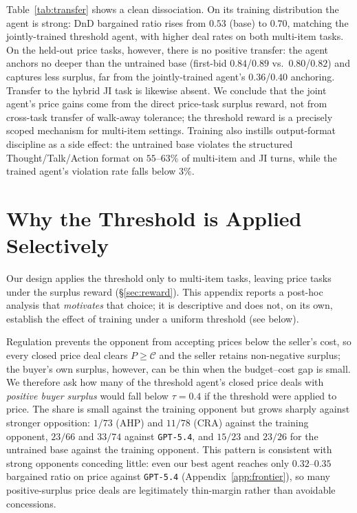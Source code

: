 \documentclass[11pt]{article}
\newcommand{\model}[1]{\texttt{#1}}
\begin{document}
Table~\ref{tab:transfer} shows a clean dissociation. On its training distribution the agent is strong: DnD bargained ratio rises from $0.53$ (base) to $0.70$, matching the jointly-trained threshold agent, with higher deal rates on both multi-item tasks. On the held-out price tasks, however, there is no positive transfer: the agent anchors no deeper than the untrained base (first-bid $0.84$/$0.89$ vs.\ $0.80$/$0.82$) and captures less surplus, far from the jointly-trained agent's $0.36$/$0.40$ anchoring. Transfer to the hybrid JI task is likewise absent. We conclude that the joint agent's price gains come from the direct price-task surplus reward, not from cross-task transfer of walk-away tolerance; the threshold reward is a precisely scoped mechanism for multi-item settings. Training also instills output-format discipline as a side effect: the untrained base violates the structured Thought/Talk/Action format on $55$--$63\%$ of multi-item and JI turns, while the trained agent's violation rate falls below $3\%$.

\section{Why the Threshold is Applied Selectively}
\label{app:uniform}

Our design applies the threshold only to multi-item tasks, leaving price tasks under the surplus reward (\S\ref{sec:reward}). This appendix reports a post-hoc analysis that \emph{motivates} that choice; it is descriptive and does not, on its own, establish the effect of training under a uniform threshold (see below).

Regulation prevents the opponent from accepting prices below the seller's cost, so every closed price deal clears $P \geq \mathcal{C}$ and the seller retains non-negative surplus; the buyer's own surplus, however, can be thin when the budget--cost gap is small. We therefore ask how many of the threshold agent's closed price deals with \emph{positive buyer surplus} would fall below $\tau{=}0.4$ if the threshold were applied to price. The share is small against the training opponent but grows sharply against stronger opposition: $1/73$ (AHP) and $11/78$ (CRA) against the training opponent, $23/66$ and $33/74$ against \model{GPT-5.4}, and $15/23$ and $23/26$ for the untrained base against the training opponent. This pattern is consistent with strong opponents conceding little: even our best agent reaches only $0.32$--$0.35$ bargained ratio on price against \model{GPT-5.4} (Appendix~\ref{app:frontier}), so many positive-surplus price deals are legitimately thin-margin rather than avoidable concessions.
\end{document}
